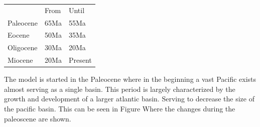 \documentclass[a4paper]{article}
\begin{document}
\begin{multicols}{2}
\begin{table}[H]
	\begin{tabular}{lll}
		&From &Until \\
		Paleocene & 65Ma&55Ma    \\
		Eocene    & 50Ma&35Ma     \\
		Oligocene & 30Ma&20Ma    \\
		Miocene   & 20Ma&Present 
	\end{tabular}
\end{table}

The model is started in the Paleocene where in the beginning a vast Pacific exists almost serving as a single basin. This period is largely characterized by the growth and development of a larger atlantic basin. Serving to decrease the size of the pacific basin. This can be seen in Figure %
Where the changes during the paleoscene are shown.
\begin{figure}[H]
	

\end{figure}
\end{multicols}
\end{document}

